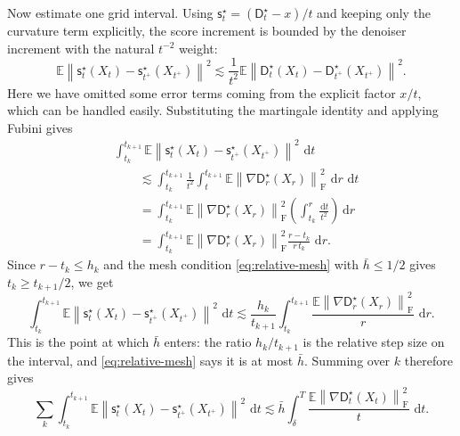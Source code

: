 \documentclass[10pt,a4paper]{amsart}
\numberwithin{equation}{section}
\newcommand{\E}{\mathbb{E}}
\newcommand{\dd}{\,\mathrm{d}}
\newcommand{\norm}[1]{\left\lVert #1 \right\rVert}
\newcommand{\sstar}{\mathsf{s}^{\star}}
\newcommand{\dstar}{\mathsf{D}^{\star}}
\begin{document}
Now estimate one grid interval.  Using
$\sstar_t=(\dstar_t-x)/t$ and keeping only the curvature term explicitly, the
score increment is bounded by the denoiser increment with the natural $t^{-2}$
weight:
\[
    \E\norm{
        \sstar_t(X_t)-\sstar_{t^+}(X_{t^+})
    }^2
    \lesssim
    \frac{1}{t^2}
    \E\norm{
        \dstar_t(X_t)-\dstar_{t^+}(X_{t^+})
    }^2.
\]
Here we have omitted some error terms coming from the explicit factor $x/t$, which can be handled easily.  Substituting the martingale identity and applying Fubini gives
\[
\begin{aligned}
    &\int_{t_k}^{t_{k+1}}
    \E\norm{
        \sstar_t(X_t)-\sstar_{t^+}(X_{t^+})
    }^2\,\dd t  \\
    &\qquad\lesssim
    \int_{t_k}^{t_{k+1}}
    \frac{1}{t^2}
    \int_t^{t_{k+1}}
    \E\norm{\nabla \dstar_r(X_r)}_{\mathrm F}^2\,\dd r\,\dd t  \\
    &\qquad=
    \int_{t_k}^{t_{k+1}}
    \E\norm{\nabla \dstar_r(X_r)}_{\mathrm F}^2
    \left(\int_{t_k}^r\frac{\dd t}{t^2}\right)\dd r  \\
    &\qquad=
    \int_{t_k}^{t_{k+1}}
    \E\norm{\nabla \dstar_r(X_r)}_{\mathrm F}^2
    \frac{r-t_k}{r\,t_k}\,\dd r.
\end{aligned}
\]
Since $r-t_k\leq h_k$ and the mesh condition
\eqref{eq:relative-mesh} with $\bar h\leq1/2$ gives
$t_k\geq t_{k+1}/2$, we get
\[
    \int_{t_k}^{t_{k+1}}
    \E\norm{
        \sstar_t(X_t)-\sstar_{t^+}(X_{t^+})
    }^2\,\dd t
    \lesssim
    \frac{h_k}{t_{k+1}}
    \int_{t_k}^{t_{k+1}}
    \frac{\E\norm{\nabla \dstar_r(X_r)}_{\mathrm F}^2}{r}\,\dd r.
\]
This is the point at which $\bar h$ enters: the ratio $h_k/t_{k+1}$ is the
relative step size on the interval, and \eqref{eq:relative-mesh} says it is at
most $\bar h$.  Summing over $k$ therefore gives
\[
    \sum_k
    \int_{t_k}^{t_{k+1}}
    \E\norm{
        \sstar_t(X_t)-\sstar_{t^+}(X_{t^+})
    }^2\,\dd t
    \lesssim
    \bar h
    \int_\delta^T
    \frac{\E\norm{\nabla \dstar_t(X_t)}_{\mathrm F}^2}{t}\,\dd t.
\]
\end{document}
